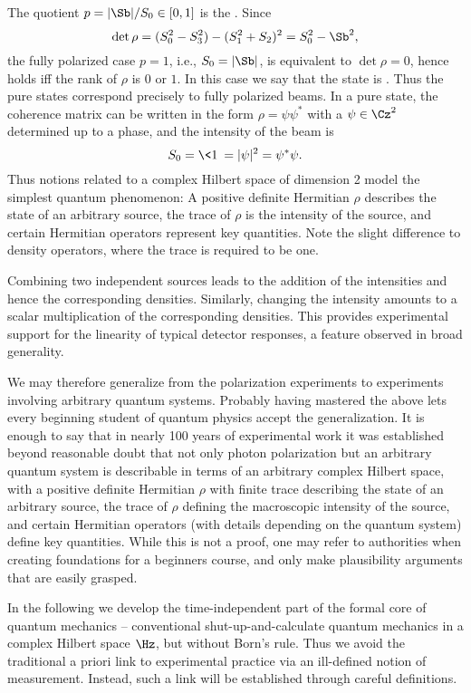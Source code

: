 \documentclass[12pt]{article}
\begin{document}
The quotient $p=|\Sb|/S_0\in[0,1]$ is the .
Since
\[
\det\rho=(S_0^2-S_3^2)-(S_1^2+S_2)^2=S_0^2-\Sb^2,
\]
the fully polarized case $p=1$, i.e., $S_0=|\Sb|$, is equivalent to
$\det\rho=0$, hence holds iff the rank of $\rho$ is $0$ or $1$. In this
case we say that the state is . Thus the pure states
correspond precisely to fully polarized beams. In a pure state, the
coherence matrix can be written in the form $\rho=\psi\psi^*$
with a  $\psi\in\Cz^2$ determined up to a phase, and
the intensity of the beam is
\[
S_0=\<1\>=|\psi|^2=\psi^*\psi.
\]
Thus notions related to a complex Hilbert space of dimension 2 model
the simplest quantum phenomenon: A positive definite Hermitian $\rho$
describes the state of an arbitrary source, the trace of $\rho$ is the
intensity of the source, and certain Hermitian operators represent key
quantities. Note the slight difference to density operators, where the
trace is required to be one.

Combining two independent sources leads to the addition of the
intensities and hence the corresponding densities. Similarly, changing
the intensity amounts to a scalar multiplication of the corresponding
densities. This provides experimental support
for the linearity of typical detector responses, a feature observed in
broad generality.

We may therefore generalize from the polarization experiments to
experiments involving arbitrary quantum systems. Probably having
mastered the above lets every beginning student of quantum physics
accept the generalization. It is enough to say that in nearly
100 years of experimental work it was established beyond reasonable
doubt that not only photon polarization but an arbitrary quantum
system is describable in terms of an arbitrary complex Hilbert space,
with a positive definite Hermitian $\rho$ with finite trace describing
the state of an arbitrary source, the trace of $\rho$ defining the
macroscopic intensity of the source, and certain Hermitian operators
(with details depending on the quantum system) define key quantities.
While this is not a proof, one may refer to authorities when creating
foundations for a beginners course, and only make plausibility arguments
that are easily grasped.

In the following we develop the time-independent part of the formal core
of quantum mechanics -- conventional shut-up-and-calculate quantum
mechanics in a complex Hilbert space $\Hz$, but without Born's rule.
Thus we avoid the traditional a priori link to experimental practice via
an ill-defined notion of measurement. Instead, such a link will be
established through careful definitions.
\end{document}
